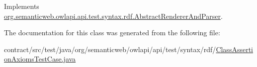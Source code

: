 Implements \hyperlink{classorg_1_1semanticweb_1_1owlapi_1_1api_1_1test_1_1syntax_1_1rdf_1_1_abstract_renderer_and_parser_a6eb3d4cdc99bab1338cfad6899390e9f}{org.\-semanticweb.\-owlapi.\-api.\-test.\-syntax.\-rdf.\-Abstract\-Renderer\-And\-Parser}.



The documentation for this class was generated from the following file\-:\begin{DoxyCompactItemize}
\item 
contract/src/test/java/org/semanticweb/owlapi/api/test/syntax/rdf/\hyperlink{_class_assertion_axioms_test_case_8java}{Class\-Assertion\-Axioms\-Test\-Case.\-java}\end{DoxyCompactItemize}
